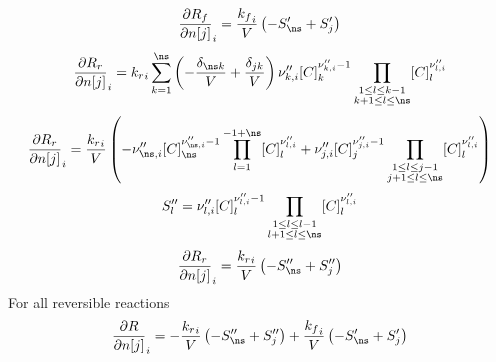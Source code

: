 \documentclass[a4paper,10pt]{article}
\begin{document}
\begin{dmath} \frac{\partial {R_f} }{\partial n[j] }_{i} = \frac{{k_f}_{i}}{V} \left(- S^{\prime}_{\ns} + S^{\prime}_{j}\right)\end{dmath} 
\begin{dmath} \frac{\partial {R_r} }{\partial n[j] }_{i} = {k_r}_{i} \sum_{k=1}^{\ns} \left(- \frac{\delta_{\ns k}}{V} + \frac{\delta_{j k}}{V}\right) \nu^{\prime\prime}_{k,i} [C]_{k}^{\nu^{\prime\prime}_{k,i} - 1} \prod_{\substack{1 \leq l \leq k - 1\\k + 1 \leq l \leq \ns}} [C]_{l}^{\nu^{\prime\prime}_{l,i}}\end{dmath} 
\begin{dmath} \frac{\partial {R_r} }{\partial n[j] }_{i} = \frac{{k_r}_{i}}{V} \left(- \nu^{\prime\prime}_{\ns,i} [C]_{\ns}^{\nu^{\prime\prime}_{\ns,i} - 1} \prod_{l=1}^{-1 + \ns} [C]_{l}^{\nu^{\prime\prime}_{l,i}} + \nu^{\prime\prime}_{j,i} [C]_{j}^{\nu^{\prime\prime}_{j,i} - 1} \prod_{\substack{1 \leq l \leq j - 1\\j + 1 \leq l \leq \ns}} [C]_{l}^{\nu^{\prime\prime}_{l,i}}\right)\end{dmath} 
\begin{dmath} S^{\prime\prime}_{l} = \nu^{\prime\prime}_{l,i} [C]_{l}^{\nu^{\prime\prime}_{l,i} - 1} \prod_{\substack{1 \leq l \leq l - 1\\l + 1 \leq l \leq \ns}} [C]_{l}^{\nu^{\prime\prime}_{l,i}}\end{dmath} 
\begin{dmath} \frac{\partial {R_r} }{\partial n[j] }_{i} = \frac{{k_r}_{i}}{V} \left(- S^{\prime\prime}_{\ns} + S^{\prime\prime}_{j}\right)\end{dmath} 
For all reversible reactions
\begin{dmath} \frac{\partial R }{\partial n[j] }_{i} = - \frac{{k_r}_{i}}{V} \left(- S^{\prime\prime}_{\ns} + S^{\prime\prime}_{j}\right) + \frac{{k_f}_{i}}{V} \left(- S^{\prime}_{\ns} + S^{\prime}_{j}\right)\end{dmath} 
\end{document}
